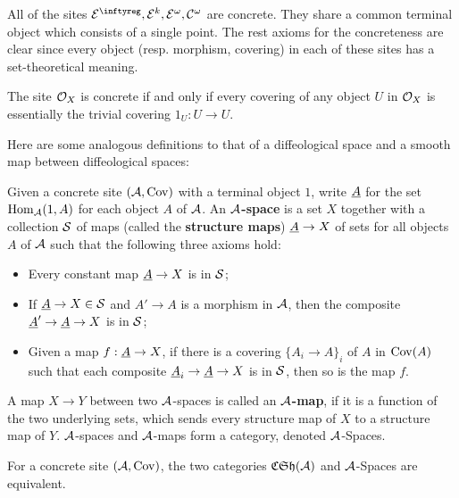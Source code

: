 \begin{example}
  All of the sites $\cE^\infty,\cE^k,\cE^\omega,\cC^\omega$ are concrete.
  They share a common terminal object which consists of a single point.
  The rest axioms for the concreteness are clear since every object (resp. morphism, covering) in each of these sites has a set-theoretical meaning.
\end{example}

\begin{example}
  The site $\mathcal{O}_X$ is concrete if and only if every covering of any object $U$ in $\mathcal{O}_X$ is essentially the trivial covering $1_U:U \to U$.
\end{example}

Here are some analogous definitions to that of a diffeological space and a smooth map between diffeological spaces:

\begin{definition}
  Given a concrete site $(\mathcal{A},\mathrm{Cov})$ with a terminal object $1$,
  write $\underline{A}$ for the set $\mathrm{Hom}_{\mathcal{A}}(1,A)$ for each object $A$ of $\mathcal{A}$.
  An \textbf{$\mathcal{A}$-space} is a set $X$ together with a collection $\mathcal{S}$ of maps (called the \textbf{structure maps}) $\underline{A} \to X$ of sets for all objects $A$ of $\mathcal{A}$ such that the following three axioms hold:
  \begin{itemize}
    \item[*] Every constant map $\underline{A} \to X$ is in $\mathcal{S}$;
    \item[*] If $\underline{A} \to X \in \mathcal{S}$ and $A' \to A$ is a morphism in $\mathcal{A}$,
    then the composite $\underline{A}' \to \underline{A} \to X$ is in $\mathcal{S}$;
    \item[*] Given a map $f:\underline{A} \to X$,
    if there is a covering $\{A_i \to A\}_i$ of $A$ in $\mathrm{Cov}(A)$ such that each composite $\underline{A}_i \to \underline{A} \to X$ is in $\mathcal{S}$,
    then so is the map $f$.
  \end{itemize}
  A map $X \to Y$ between two $\mathcal{A}$-spaces is called an \textbf{$\mathcal{A}$-map},
  if it is a function of the two underlying sets,
  which sends every structure map of $X$ to a structure map of $Y$.
  $\mathcal{A}$-spaces and $\mathcal{A}$-maps form a category,
  denoted $\mathcal{A}$-Spaces.
\end{definition}

\begin{theorem}
  For a concrete site $(\mathcal{A},\mathrm{Cov})$,
  the two categories $\mathfrak{CSh}(\mathcal{A})$ and $\mathcal{A}$-Spaces are equivalent.
\end{theorem}

